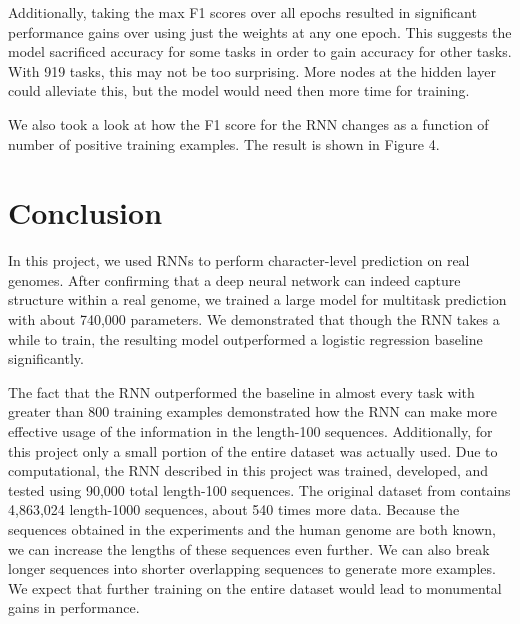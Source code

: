 \documentclass{article} %
\begin{document}
Additionally, taking the max F1 scores over all epochs resulted in significant performance gains over using just the weights at any one epoch. This suggests the model sacrificed accuracy for some tasks in order to gain accuracy for other tasks. With 919 tasks, this may not be too surprising. More nodes at the hidden layer could alleviate this, but the model would need then more time for training.

We also took a look at how the F1 score for the RNN changes as a function of number of positive training examples. The result is shown in Figure 4. 

\section{Conclusion}
In this project, we used RNNs to perform character-level prediction on real genomes. After confirming that a deep neural network can indeed capture structure within a real genome, we trained a large model for multitask prediction with about 740,000 parameters. We demonstrated that though the RNN takes a while to train, the resulting model outperformed a logistic regression baseline significantly.

The fact that the RNN outperformed the baseline in almost every task with greater than 800 training examples demonstrated how the RNN can make more effective usage of the information in the length-100 sequences. Additionally, for this project only a small portion of the entire dataset was actually used. Due to computational, the RNN described in this project was trained, developed, and tested using 90,000 total length-100 sequences. The original dataset from \cite{zhou2015predicting} contains 4,863,024 length-1000 sequences, about 540 times more data. Because the sequences obtained in the experiments and the human genome are both known, we can increase the lengths of these sequences even further. We can also break longer sequences into shorter overlapping sequences to generate more examples. We expect that further training on the entire dataset would lead to monumental gains in performance. 
\end{document}
